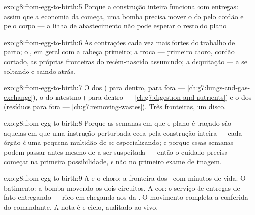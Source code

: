 \begin{solution}{exo:g8:from-egg-to-birth:5}
Porque a construção inteira funciona com entregas: assim que a
economia da  começa, uma bomba precisa mover o  do
 pelo cordão e pelo corpo --- a linha de abastecimento não pode
esperar o resto do plano.
\end{solution}

\begin{solution}{exo:g8:from-egg-to-birth:6}
As contrações cada vez mais fortes do trabalho de parto; o
, em geral com a cabeça primeiro; a troca --- primeiro
choro, cordão cortado, as próprias fronteiras do recém-nascido
assumindo; a dequitação --- a  se soltando e saindo atrás.
\end{solution}

\begin{solution}{exo:g8:from-egg-to-birth:7}
O dos  ( para dentro,  para fora ---
\cref{ch:g7:lungs-and-gas-exchange}), o do intestino ( para
dentro --- \cref{ch:g7:digestion-and-nutrients}) e o dos 
(resíduos para fora --- \cref{ch:g7:removing-wastes}). Três fronteiras,
um disco.
\end{solution}

\begin{solution}{exo:g8:from-egg-to-birth:8}
Porque as semanas em que o plano é traçado são aquelas em que uma
instrução perturbada ecoa pela construção inteira --- cada órgão é uma
pequena multidão de  se especializando; e porque essas semanas
podem passar antes mesmo de a  ser suspeitada --- então o
cuidado precisa começar na primeira possibilidade, e não no primeiro
exame de imagem.
\end{solution}

\begin{solution}{exo:g8:from-egg-to-birth:9}
A  e o choro: a fronteira dos , com minutos de vida.
O batimento: a bomba movendo os dois circuitos. A cor: o serviço de
entregas de fato entregando ---  rico em  chegando aos
 da . O movimento completa a conferida do comandante. A
nota é o ciclo, auditado ao vivo.
\end{solution}

